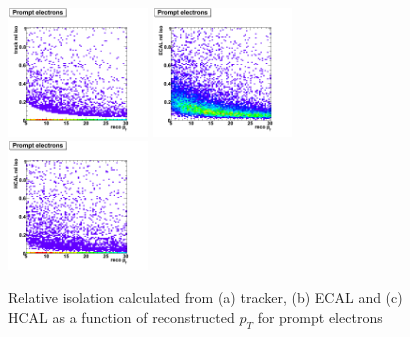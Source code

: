  \begin{figure}[htbp]
    \includegraphics[width = 0.33\textwidth]{pictures/recoPt_relIso/trackIso_elec_prompt.png}
    \includegraphics[width = 0.33\textwidth]{pictures/recoPt_relIso/ecalIso_elec_prompt.png}
    \includegraphics[width = 0.33\textwidth]{pictures/recoPt_relIso/hcalIso_elec_prompt.png}
    \caption{Relative isolation calculated from (a) tracker, (b) ECAL and (c) HCAL as a function of
       reconstructed $p_{T}$ for prompt electrons}
    \label{fig:PromptElecRecoPt_RelIso}
 \end{figure}

 \clearpage

